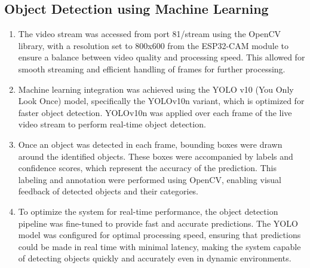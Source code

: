 \documentclass[12pt,a4paper]{report}
\begin{document}
\subsection{Object Detection using Machine Learning}
\begin{enumerate}
    \item The video stream was accessed from port 81/stream using the OpenCV library, with a resolution set to 800x600 from the ESP32-CAM module to ensure a balance between video quality and processing speed. This allowed for smooth streaming and efficient handling of frames for further processing.
    \item Machine learning integration was achieved using the YOLO v10 (You Only Look Once) model, specifically the YOLOv10n variant, which is optimized for faster object detection. YOLOv10n was applied over each frame of the live video stream to perform real-time object detection.
    \item Once an object was detected in each frame, bounding boxes were drawn around the identified objects. These boxes were accompanied by labels and confidence scores, which represent the accuracy of the prediction. This labeling and annotation were performed using OpenCV, enabling visual feedback of detected objects and their categories.
    \item To optimize the system for real-time performance, the object detection pipeline was fine-tuned to provide fast and accurate predictions. The YOLO model was configured for optimal processing speed, ensuring that predictions could be made in real time with minimal latency, making the system capable of detecting objects quickly and accurately even in dynamic environments.
    

\end{enumerate}
\end{document}
